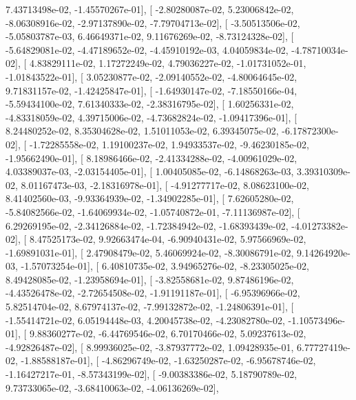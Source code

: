 \documentclass{article}
\begin{document}
          7.43713498e-02,  -1.45570267e-01],
       [ -2.80280087e-02,   5.23006842e-02,  -8.06308916e-02,
         -2.97137890e-02,  -7.79704713e-02],
       [ -3.50513506e-02,  -5.05803787e-03,   6.46649371e-02,
          9.11676269e-02,  -8.73124328e-02],
       [ -5.64829081e-02,  -4.47189652e-02,  -4.45910192e-03,
          4.04059834e-02,  -4.78710034e-02],
       [  4.83829111e-02,   1.17272249e-02,   4.79036227e-02,
         -1.01731052e-01,  -1.01843522e-01],
       [  3.05230877e-02,  -2.09140552e-02,  -4.80064645e-02,
          9.71831157e-02,  -1.42425847e-01],
       [ -1.64930147e-02,  -7.18550166e-04,  -5.59434100e-02,
          7.61340333e-02,  -2.38316795e-02],
       [  1.60256331e-02,  -4.83318059e-02,   4.39715006e-02,
         -4.73682824e-02,  -1.09417396e-01],
       [  8.24480252e-02,   8.35304628e-02,   1.51011053e-02,
          6.39345075e-02,  -6.17872300e-02],
       [ -1.72285558e-02,   1.19100237e-02,   1.94933537e-02,
         -9.46230185e-02,  -1.95662490e-01],
       [  8.18986466e-02,  -2.41334288e-02,  -4.00961029e-02,
          4.03389037e-03,  -2.03154405e-01],
       [  1.00405085e-02,  -6.14868263e-03,   3.39310309e-02,
          8.01167473e-03,  -2.18316978e-01],
       [ -4.91277717e-02,   8.08623100e-02,   8.41402560e-03,
         -9.93364939e-02,  -1.34902285e-01],
       [  7.62605280e-02,  -5.84082566e-02,  -1.64069934e-02,
         -1.05740872e-01,  -7.11136987e-02],
       [  6.29269195e-02,  -2.34126884e-02,  -1.72384942e-02,
         -1.68393439e-02,  -4.01273382e-02],
       [  8.47525173e-02,   9.92663474e-04,  -6.90940431e-02,
          5.97566969e-02,  -1.69891031e-01],
       [  2.47908479e-02,   5.46069924e-02,  -8.30086791e-02,
          9.14264920e-03,  -1.57073254e-01],
       [  6.40810735e-02,   3.94965276e-02,  -8.23305025e-02,
          8.49428085e-02,  -1.23958694e-01],
       [ -3.82558681e-02,   9.87486196e-02,  -4.43526478e-02,
         -2.72654508e-02,  -1.91191187e-01],
       [ -6.95396966e-02,   5.82514704e-02,   8.67974137e-02,
         -7.99132872e-02,  -1.24806391e-01],
       [ -1.55414721e-02,   6.05194448e-03,   4.20045738e-02,
         -4.23082780e-02,  -1.10573496e-01],
       [  9.88360277e-02,  -6.44769546e-02,   6.70170466e-02,
          5.09237613e-02,  -4.92826487e-02],
       [  8.99936025e-02,  -3.87937772e-02,   1.09428935e-01,
          6.77727419e-02,  -1.88588187e-01],
       [ -4.86296749e-02,  -1.63250287e-02,  -6.95678746e-02,
         -1.16427217e-01,  -8.57343199e-02],
       [ -9.00383386e-02,   5.18790789e-02,   9.73733065e-02,
         -3.68410063e-02,  -4.06136269e-02],
\end{document}
